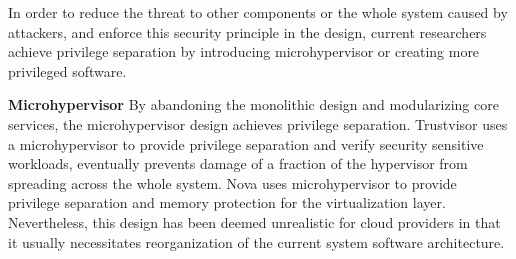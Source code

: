 ﻿\documentclass[conference]{IEEEtran}
\begin{document}
In order to reduce the threat to other components or the whole system caused by attackers, and enforce this security principle in the design, current researchers achieve privilege separation by introducing microhypervisor or creating more privileged software.


\textbf{Microhypervisor}
By abandoning the monolithic design and modularizing core services, the microhypervisor design achieves privilege separation.
Trustvisor\cite{J2010TrustVisor} uses a microhypervisor to provide privilege separation and verify security sensitive workloads, eventually prevents damage of a fraction of the hypervisor from spreading across the whole system. Nova\cite{Steinberg2010NOVA} uses microhypervisor to provide privilege separation and memory protection for the virtualization layer. Nevertheless, this design has been deemed unrealistic for cloud providers in that it usually necessitates reorganization of the current system software architecture. 

\end{document}
